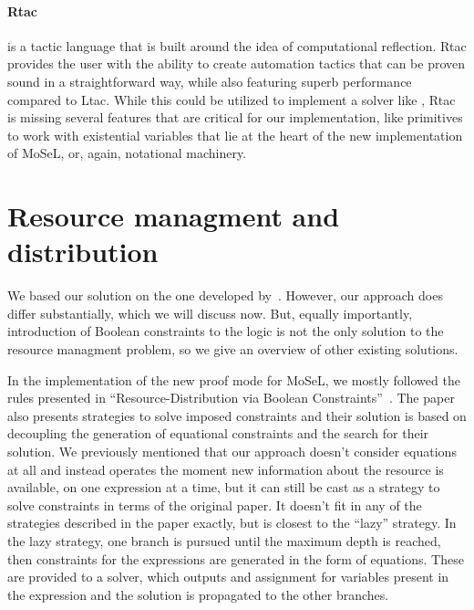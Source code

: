 \paragraph{Rtac~\cite{malechaExtensibleEfficientAutomation2016}} is a tactic language that is built around the idea of computational reflection.
  Rtac provides the user with the ability to create automation tactics that can be proven sound in a straightforward way, while also featuring superb performance compared to Ltac.
  While this could be utilized to implement a solver like , Rtac is missing several features that are critical for our implementation, like primitives to work with existential variables that lie at the heart of the new implementation of MoSeL, or, again, notational machinery.

\section{Resource managment and distribution}
\label{sec:reso-managm-distr}
We based our solution on the one developed by~\citet{harlandResourceDistributionBooleanConstraints2003}.
However, our approach does differ substantially, which we will discuss now.
But, equally importantly, introduction of Boolean constraints to the logic is not the only solution to the resource managment problem, so we give an overview of other existing solutions.

In the implementation of the new proof mode for MoSeL, we mostly followed the rules presented in ``Resource-Distribution via Boolean Constraints''~\cite{harlandResourceDistributionBooleanConstraints2003}.
  The paper also presents strategies to solve imposed constraints and their solution is based on decoupling the generation of equational constraints and the search for their solution.
  We previously mentioned that our approach doesn't consider equations at all and instead operates the moment new information about the resource is available, on one expression at a time, but it can still be cast as a strategy to solve constraints in terms of the original paper.
   It doesn't fit in any of the strategies described in the paper exactly, but is closest to the ``lazy'' strategy.
  In the lazy strategy, one branch is pursued until the maximum depth is reached, then constraints for the expressions are generated in the form of equations.
These are provided to a solver, which outputs and assignment for variables present in the expression and the solution is propagated to the other branches.

